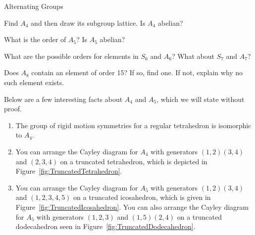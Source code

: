\begin{section}{Alternating Groups}
\begin{problem}
Find $A_4$ and then draw its subgroup lattice. Is $A_4$ abelian?
\end{problem}

\begin{problem}
What is the order of $A_5$?  Is $A_5$ abelian?
\end{problem}

\begin{problem}
What are the possible orders for elements in $S_6$ and $A_6$?  What about $S_7$ and $A_7$?
\end{problem}

\begin{problem}
Does $A_8$ contain an element of order 15?  If so, find one.  If not, explain why no such element exists.
\end{problem}

\begin{remark}
Below are a few interesting facts about $A_4$ and $A_5$, which we will state without proof.
\begin{enumerate}[label=\textrm{(\alph*)}]
\item The group of rigid motion symmetries for a regular tetrahedron is isomorphic to $A_4$.
\item You can arrange the Cayley diagram for $A_4$ with generators $(1,2)(3,4)$ and $(2,3,4)$ on a truncated tetrahedron, which is depicted in Figure~\ref{fig:TruncatedTetrahedron}.
\item You can arrange the Cayley diagram for $A_5$ with generators $(1,2)(3,4)$ and $(1,2,3,4,5)$ on a truncated icosahedron, which is given in Figure~\ref{fig:TruncatedIcosahedron}.  You can also arrange the Cayley diagram for $A_5$ with generators $(1,2,3)$ and $(1,5)(2,4)$ on a truncated dodecahedron seen in Figure~\ref{fig:TruncatedDodecahedron}. 
\end{enumerate}
\end{remark}


\end{section}
